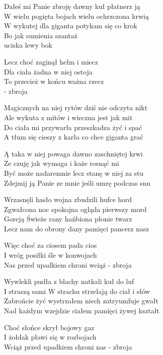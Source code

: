 \begin{text}
    Dałeś mi Panie zbroję dawny kuł płatnerz ją\\
    W wielu pogięta bojach wielu ochrzczona krwią\\
    W wykutej dla giganta potykam się co krok\\
    Bo jak sumienia szantaż\\
	uciska lewy bok

    \vin Lecz choć zaginął hełm i miecz\\
    \vin Dla ciała żadna w niej ostoja\\
    \vin To przecież w końcu ważna rzecz\\
    \vin - zbroja

    Magicznych na niej rytów dziś nie odczyta nikt\\
    Ale wykuta z mitów i wieczna jest jak mit\\
    Do ciała mi przywarła przeszkadza żyć i spać\\
    A tłum się cieszy z karła co chce giganta grać

    Ą taka w niej powaga dawno zaschniętej krwi\\
    Ze czuję jak wymaga i każe rosnąć mi\\
    Być może nadaremnie lecz stanę w niej za stu\\
    Zdejmij ją Panie ze mnie jeśli umrę podczas snu

    Wrzasnęli hasło wojna zbudzili hufce hord\\
    Zgwałcona noc spokojna ogląda pierwszy mord\\
    Goreją Świeże rany hańbiona płonie twarz\\
    Lecz nam do obrony dany pamięci pancerz nasz

    \vin Więc choć za ciosem pada cios\\
    \vin I wróg posiłki śle w konwojach\\
    \vin Nas przed upadkiem chroni wciąż - zbroja

    Wywlekli pudła z blachy natkali kuł do luf\\
    I straszą sami W strachu strzelają do ciał i słów\\
    Zabrońcie żyć wystrzałem niech zatryumfuje gwałt\\
    Nad każdym wzejdzie ciałem pamięci żywej kształt

    \vin Choć słońce skrył bojowy gaz\\
    \vin I żołdak pławi się w rozbojach\\
    \vin Wciąż przed upadkiem chroni nas - zbroja


\end{text}

